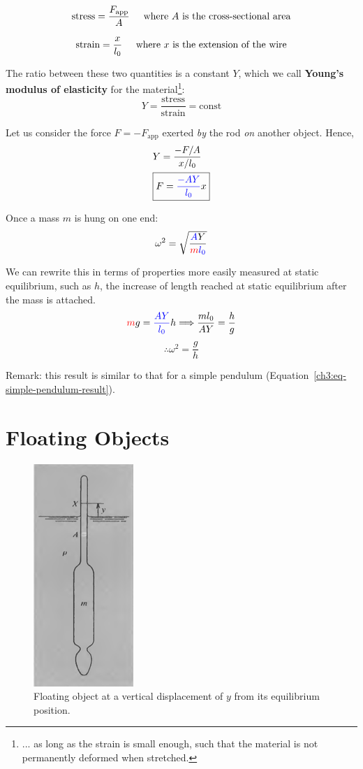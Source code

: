 \[ \text{stress} = \frac{F_\text{app}}{A} \hspace{0.5cm}\text{where }\text{$A$ is the cross-sectional area} \]

\[  \text{strain} = \frac{x}{l_0} \hspace{0.5cm}\text{where }\text{$x$ is the extension of the wire}  \]

The ratio between these two quantities is a constant $Y$, which we call \textbf{Young's modulus of elasticity} for the material\footnote{... as long as the strain is small enough, such that the material is not permanently deformed when stretched.}:
\begin{equation}
	\boxed{ Y = \frac{\text{stress}}{\text{strain}} = \text{const}} \label{ch3:eq-Youngs-Modulus}
\end{equation}

Let us consider the force $F = -F_\text{app}$ exerted \emph{by} the rod \emph{on} another object. Hence,
\begin{align}
	& Y = \frac{-F/A}{x/l_0} \notag \\
	& \boxed{F = \textcolor{blue}{\frac{-AY}{l_0}} x } \label{ch3:eq-Youngs-F}
\end{align}


Once a mass $m$ is hung on one end:
\[ \omega^2 = \sqrt{\frac{\textcolor{blue}{A}Y}{\textcolor{red}{m} \textcolor{blue}{l_0}}} \]

We can rewrite this in terms of properties more easily measured at static equilibrium, such as $h$, the increase of length reached at static equilibrium after the mass is attached.
\[ \textcolor{red}{m}g=\textcolor{blue}{\frac{AY}{l_0}} h \Longrightarrow \frac{ml_0}{AY}=\frac{h}{g} \]
\begin{equation}
\therefore \omega^2 = \frac{g}{h}  \label{ch3:eq-elastic-wire-result}
\end{equation} 

Remark: this result is similar to that for a simple pendulum (Equation~\ref{ch3:eq-simple-pendulum-result}).

\section{Floating Objects} \label{ch3:sec-floating}

\begin{figure}[h]
	\centering
	\includegraphics[scale=0.6]{phys232/Ch3-floating.png} \caption{Floating object at a vertical displacement of $y$ from its equilibrium position.}\label{ch3:fig-floating}
\end{figure}

